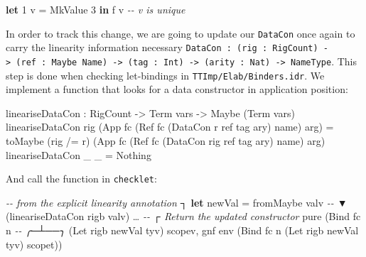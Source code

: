 \documentclass[
]{article}
\newenvironment{Shaded}{}{}
\newcommand{\CommentTok}[1]{\textcolor[rgb]{0.38,0.63,0.69}{\textit{#1}}}
\newcommand{\DataTypeTok}[1]{\textcolor[rgb]{0.56,0.13,0.00}{#1}}
\newcommand{\DecValTok}[1]{\textcolor[rgb]{0.25,0.63,0.44}{#1}}
\newcommand{\FunctionTok}[1]{\textcolor[rgb]{0.02,0.16,0.49}{#1}}
\newcommand{\KeywordTok}[1]{\textcolor[rgb]{0.00,0.44,0.13}{\textbf{#1}}}
\newcommand{\NormalTok}[1]{#1}
\newcommand{\OperatorTok}[1]{\textcolor[rgb]{0.40,0.40,0.40}{#1}}
\newcommand{\OtherTok}[1]{\textcolor[rgb]{0.00,0.44,0.13}{#1}}
\begin{document}
\begin{Shaded}
\begin{Highlighting}[]
\KeywordTok{let} \DecValTok{1}\NormalTok{ v }\OtherTok{=} \DataTypeTok{MkValue} \DecValTok{3} \KeywordTok{in}
\NormalTok{    f v }\CommentTok{{-}{-} v is unique}
\end{Highlighting}
\end{Shaded}

In order to track this change, we are going to update our
\texttt{DataCon} once again to carry the linearity information necessary
\texttt{DataCon\ :\ (rig\ :\ RigCount)\ -\textgreater{}\ (ref\ :\ Maybe\ Name)\ -\textgreater{}\ (tag\ :\ Int)\ -\textgreater{}\ (arity\ :\ Nat)\ -\textgreater{}\ NameType}.
This step is done when checking let-bindings in
\texttt{TTImp/Elab/Binders.idr}. We implement a function that looks for
a data constructor in application position:

\begin{Shaded}
\begin{Highlighting}[]
\NormalTok{lineariseDataCon }\OperatorTok{:} \DataTypeTok{RigCount} \OtherTok{{-}\textgreater{}} \DataTypeTok{Term}\NormalTok{ vars }
                \OtherTok{{-}\textgreater{}} \DataTypeTok{Maybe}\NormalTok{ (}\DataTypeTok{Term}\NormalTok{ vars)}
\NormalTok{lineariseDataCon rig }
\NormalTok{  (}\DataTypeTok{App}\NormalTok{ fc (}\DataTypeTok{Ref}\NormalTok{ fc\textquotesingle{} (}\DataTypeTok{DataCon}\NormalTok{ r ref tag ary) name) arg) }\OtherTok{=}
\NormalTok{    toMaybe }
\NormalTok{      (rig }\OperatorTok{/=}\NormalTok{ r) }
\NormalTok{      (}\DataTypeTok{App}\NormalTok{ fc (}\DataTypeTok{Ref}\NormalTok{ fc\textquotesingle{} (}\DataTypeTok{DataCon}\NormalTok{ rig ref tag ary) name) arg)}
\NormalTok{lineariseDataCon \_ \_ }\OtherTok{=} \DataTypeTok{Nothing}
\end{Highlighting}
\end{Shaded}

And call the function in \texttt{checklet}:

\begin{Shaded}
\begin{Highlighting}[]
\CommentTok{{-}{-}  from the explicit linearity annotation ┐}
\KeywordTok{let}\NormalTok{ newVal }\OtherTok{=}\NormalTok{ fromMaybe valv }\CommentTok{{-}{-}             ▼}
\NormalTok{                       (lineariseDataCon rigb valv)}
\NormalTok{…}
                \CommentTok{{-}{-}   ┌ Return the updated constructor}
\FunctionTok{pure}\NormalTok{ (}\DataTypeTok{Bind}\NormalTok{ fc n }\CommentTok{{-}{-} ╭─┴──╮}
\NormalTok{         (}\DataTypeTok{Let}\NormalTok{ rigb newVal tyv) scopev,}
\NormalTok{         gnf env (}\DataTypeTok{Bind}\NormalTok{ fc n (}\DataTypeTok{Let}\NormalTok{ rigb newVal\textquotesingle{} tyv) scopet))}
\end{Highlighting}
\end{Shaded}
\end{document}
